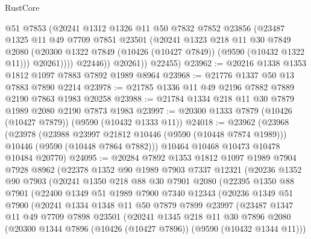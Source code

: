 \begin{lexlean}{RustCore}
\begin{coremodule}
                @51
                @7853
                (@20241
                  @1312
                  @1326
                  @11
                  @50
                  @7832
                  @7852
                  @23856
                  (@23487
                    @1325
                    @11
                    @49
                    @7709
                    @7851
                    @23501
                    (@20241
                      @1323
                      @218
                      @11
                      @30
                      @7849
                      @2080
                      (@20300 @1322 @7849 (@10426 (@10427 @7849)) (@9590 (@10432 @1322 @11)))
                      @20261))))
              @22446))
          @20261))
      @22455)
@23962 := @20216 @1338 @1353 @1812 @1097 @7883 @7892 @1989 @8964
@23968 := @21776 @1337 @50 @13 @7883 @7890 @2214
@23978 := @21785 @1336 @11 @49 @2196 @7882 @7889 @2190 @7863 @1983 @20258
@23988 := @21784 @1334 @218 @11 @30 @7879 @1989 @2080 @2190 @7873 @1983
@23997 := @20300 @1333 @7879 (@10426 (@10427 @7879)) (@9590 (@10432 @1333 @11))
@24018 := @23962
    (@23968
      (@23978
        (@23988 @23997 @21812 @10446 (@9590 (@10448 @7874 @1989)))
        @10446
        (@9590 (@10448 @7864 @7882)))
      @10464
      @10468
      @10473
      @10478
      @10484
      @20770)
@24095 := @20284
    @7892
    @1353
    @1812
    @1097
    @1989
    @7904
    @7928
    @8962
    (@22378
      @1352
      @90
      @1989
      @7903
      @7337
      @12321
      (@20236
        @1352
        @90
        @7903
        (@20241
          @1350
          @218
          @88
          @30
          @7901
          @2080
          (@22395
            @1350
            @88
            @7901
            (@22400
              @1349
              @51
              @1989
              @7900
              @7340
              @12343
              (@20236
                @1349
                @51
                @7900
                (@20241
                  @1334
                  @1348
                  @11
                  @50
                  @7879
                  @7899
                  @23997
                  (@23487
                    @1347
                    @11
                    @49
                    @7709
                    @7898
                    @23501
                    (@20241
                      @1345
                      @218
                      @11
                      @30
                      @7896
                      @2080
                      (@20300 @1344 @7896 (@10426 (@10427 @7896)) (@9590 (@10432 @1344 @11)))

\end{coremodule}
\end{lexlean}
